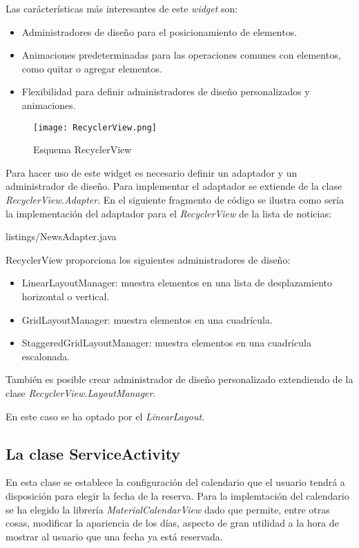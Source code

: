 \newpage
Las carácterísticas más interesantes de este \textit{widget} son:

\begin{itemize}
\item Administradores de diseño para el posicionamiento de elementos.
\item Animaciones predeterminadas para las operaciones comunes con elementos, como quitar o agregar elementos.
\item Flexibilidad para definir administradores de diseño personalizados y animaciones.
\end{itemize}

\begin{figure}[h]
	\centering
	\texttt{[image: RecyclerView.png]}
	\caption{Esquema RecyclerView}
	\label{fig:ejemplo}
\end{figure}

Para hacer uso de este widget es necesario definir un adaptador y un administrador de diseño. Para implementar el adaptador se extiende de la clase \textit{RecyclerView.Adapter}. En el siguiente fragmento de código se ilustra como sería la implementación del adaptador para el \textit{RecyclerView} de la lista de noticias:
\newpage

{listings/NewsAdapter.java} %

RecyclerView proporciona los siguientes administradores de diseño:

\begin{itemize}
\item LinearLayoutManager: muestra elementos en una lista de desplazamiento horizontal o vertical.
\item GridLayoutManager: muestra elementos en una cuadrícula.
\item StaggeredGridLayoutManager: muestra elementos en una cuadrícula escalonada.
\end{itemize}

También es posible crear administrador de diseño personalizado extendiendo de la clase \textit{RecyclerView.LayoutManager}.

En este caso se ha optado por el \textit{LinearLayout}.

\subsection{La clase ServiceActivity}
En esta clase se establece la configuración del calendario que el usuario tendrá a disposición para elegir la fecha de la reserva. Para la implemtación del calendario se ha elegido la librería \textit{MaterialCalendarView} \cite{URL::MaterialCalendarView} dado que permite, entre otras cosas, modificar la apariencia de los días, aspecto de gran utilidad a la hora de mostrar al usuario que una fecha ya está reservada.
\newline

